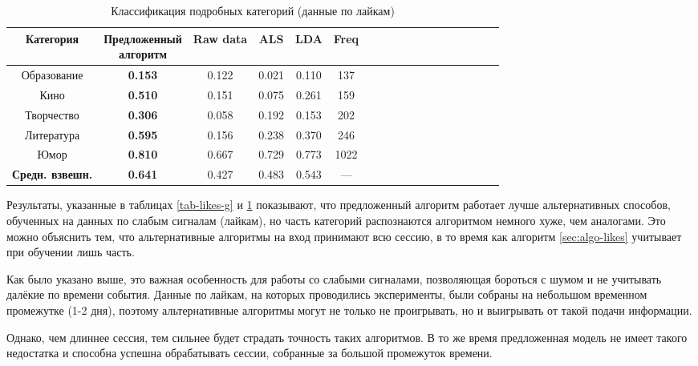 \documentclass[times,specification,annotation]{itmo-student-thesis}
\begin{document}
\begin{table}[!h]
\caption{Классификация подробных категорий (данные по лайкам)}\label{tab-likes-d}
\centering
\begin{tabular}{|*{18}{c|}}\hline
Категория & \thead{Предложенный \\  алгоритм}  & Raw data & ALS & LDA & Freq \\\hline
Образование             &  \textbf{0.153} & 0.122 & 0.021 & 0.110 & 137 \\\hline
Кино             & \textbf{0.510} & 0.151 & 0.075 &  0.261 & 159 \\\hline
Творчество            &  \textbf{0.306} & 0.058 & 0.192 & 0.153 & 202 \\\hline
Литература             & \textbf{0.595} & 0.156 & 0.238 &  0.370 & 246  \\\hline
Юмор            & \textbf{0.810} & 0.667 & 0.729 &  0.773 & 1022 \\\hline
\textbf{Средн. взвешн.}  &  \textbf{0.641} & 0.427 & 0.483 & 0.543 & --- \\\hline
\end{tabular}
\end{table}

Результаты, указанные в таблицах \ref{tab-likes-g} и \ref{tab-likes-d} показывают, что предложенный алгоритм работает лучше альтернативных способов, обученных на данных по слабым сигналам (лайкам), но часть категорий распознаются алгоритмом немного хуже, чем аналогами. Это можно объяснить тем, что альтернативные алгоритмы на вход принимают всю сессию, в то время как алгоритм \ref{sec:algo-likes} учитывает при обучении лишь часть. 

Как было указано выше, это важная особенность для работы со слабыми сигналами, позволяющая бороться с шумом и не учитывать далёкие по времени события. Данные по лайкам, на которых проводились эксперименты, были собраны на небольшом временном промежутке (1-2 дня), поэтому альтернативные алгоритмы могут не только не проигрывать, но и выигрывать от такой подачи информации. 

Однако, чем длиннее сессия, тем сильнее будет страдать точность таких алгоритмов. В то же время предложенная модель не имеет такого недостатка и способна успешна обрабатывать сессии, собранные за большой промежуток времени.
\end{document}
